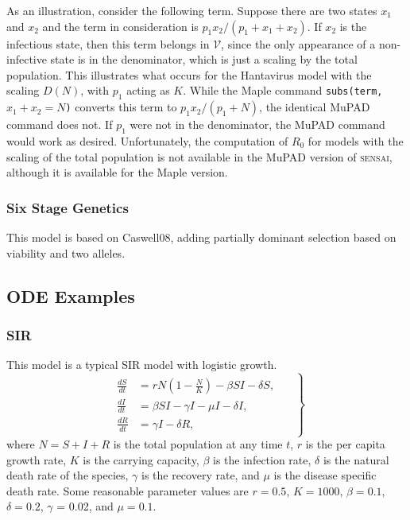\documentclass[12pt]{article}
\newcommand{\sensai}{\textsc{sensai}}
\begin{document}
As an illustration, consider the following term.  Suppose there are two states $x_1$ and $x_2$ and the term in consideration is $p_1x_2 / (p_1 + x_1+x_2)$.  If $x_2$ is the infectious state, then this term belongs in $\mathcal{V}$, since the only appearance of a non-infective state is in the denominator, which is just a scaling by the total population.  This illustrates what occurs for the Hantavirus model with the scaling $D(N)$, with $p_1$ acting as $K$.  While the {\sf Maple} command {\tt subs(term, $x_1 + x_2 = N$)} converts this term to $p_1x_2 / (p_1 + N)$, the identical MuPAD command does not.  If $p_1$ were not in the denominator, the MuPAD command would work as desired.  Unfortunately, the computation of $R_0$ for models with the scaling of the total population is not available in the MuPAD version of {\sensai}, although it is available for the {\sf Maple} version.

\subsubsection{Six Stage Genetics}

This model is based on Caswell08, adding partially dominant selection based on viability and two alleles.

\subsection{ODE Examples}

\subsubsection{SIR}

This model is a typical SIR model with logistic growth.
%
\begin{equation*}\label{eq:SIR_log}
\left . \begin{gathered} \begin{aligned}
\frac{dS}{dt} &= rN \left( 1-\frac{N}{K}\right) - \beta SI - \delta S, \quad \\
\frac{dI}{dt} &= \beta SI - \gamma I - \mu I - \delta I, \\
\frac{dR}{dt} &= \gamma I - \delta R,
\end{aligned} \end{gathered} \right \}
\end{equation*}
%
where $N = S+I+R$ is the total population at any time $t$, $r$ is the per capita growth rate, $K$ is the carrying capacity, $\beta$ is the infection rate, $\delta$ is the natural death rate of the species, $\gamma$ is the recovery rate, and $\mu$ is the disease specific death rate.  Some reasonable parameter values are $r = 0.5$, $K=1000$, $\beta = 0.1$, $\delta = 0.2$, $\gamma$ = 0.02, and $\mu = 0.1$.
\end{document}
